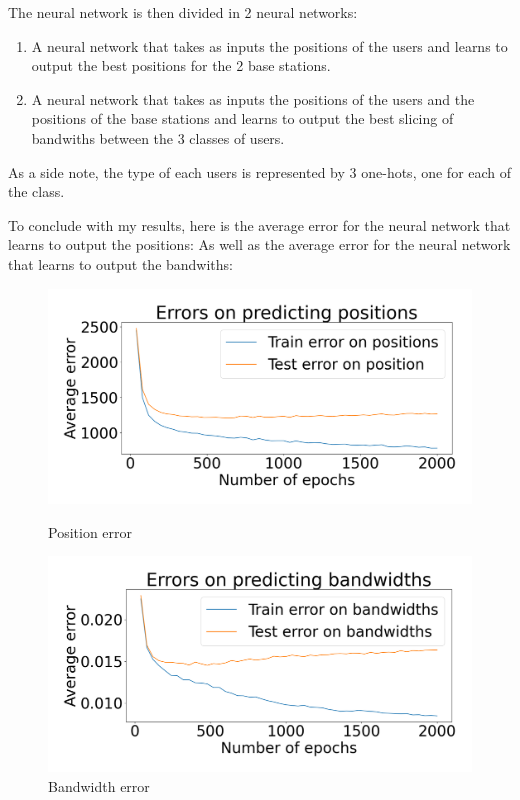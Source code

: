 \documentclass[letterpaper]{article}
\begin{document}
The neural network is then divided in 2 neural networks:

\begin{enumerate}
    \item A neural network that takes as inputs the positions of the users and learns to output the best positions for the 2 base stations.
    \item A neural network that takes as inputs the positions of the users and the positions of the base stations and learns to output the best slicing of bandwiths between the 3 classes of users.
\end{enumerate}

As a side note, the type of each users is represented by 3 one-hots, one for each of the class.

To conclude with my results, here is the average error for the neural network that learns to output the positions:
As well as the average error for the neural network that learns to output the bandwiths:

\begin{figure}[H]
    \centering
    \begin{minipage}[b]{0.45\textwidth}
        \centering
        \includegraphics[width=\textwidth]{images/mix_pos.png}
        \caption{Position error}
        \label{fig:image5}
    \end{minipage}
    \hspace{0.05\textwidth}
    \begin{minipage}[b]{0.45\textwidth}
        \centering
        \includegraphics[width=\textwidth]{images/bw_error_epochs.png}
        \caption{Bandwidth error}
        \label{fig:image6}
    \end{minipage}
\end{figure}
\end{document}
